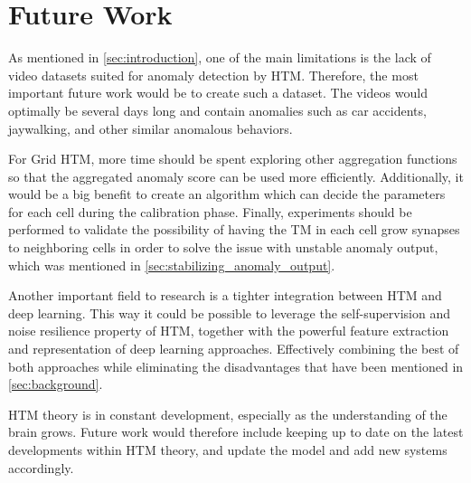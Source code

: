 \section{Future Work}
As mentioned in \autoref{sec:introduction}, one of the main limitations is the lack of video datasets suited for anomaly detection by HTM. Therefore, the most important future work would be to create such a dataset. The videos would optimally be several days long and contain anomalies such as car accidents, jaywalking, and other similar anomalous behaviors.
\par
For Grid HTM, more time should be spent exploring other aggregation functions so that the aggregated anomaly score can be used more efficiently.  Additionally, it would be a big benefit to create an algorithm which can decide the parameters for each cell during the calibration phase. Finally, experiments should be performed to validate the possibility of having the TM in each cell grow synapses to neighboring cells in order to solve the issue with unstable anomaly output, which was mentioned in \autoref{sec:stabilizing_anomaly_output}.
\par
Another important field to research is a tighter integration between HTM and deep learning. This way it could be possible to leverage the self-supervision and noise resilience property of HTM, together with the powerful feature extraction and representation of deep learning approaches. Effectively combining the best of both approaches while eliminating the disadvantages that have been mentioned in \autoref{sec:background}.
\par
HTM theory is in constant development, especially as the understanding of the brain grows. Future work would therefore include keeping up to date on the latest developments within HTM theory, and update the model and add new systems accordingly.